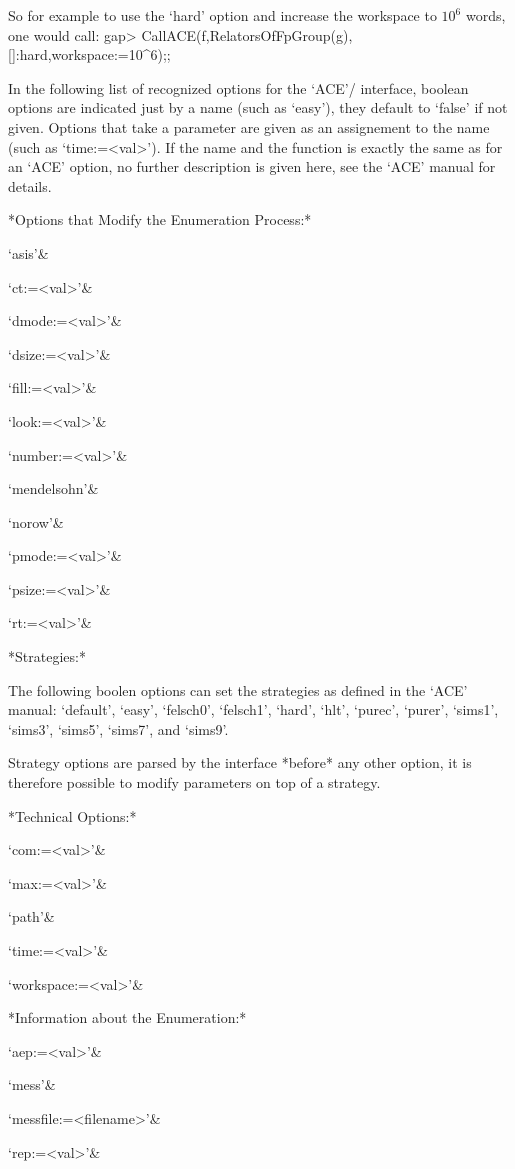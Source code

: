 So for example to use the `hard' option and increase the workspace to $10^6$
words, one would call:
\begintt
gap> CallACE(f,RelatorsOfFpGroup(g),[]:hard,workspace:=10^6);;
\endtt

In the following list of recognized options for
the `ACE'/{\GAP} interface, boolean options are indicated just by a name
(such as `easy'), they default to `false' if not given. Options that take a
parameter are given as an assignement to the name (such as `time:=<val>').
If the name and the function is exactly the same as for an `ACE' option, no
further description is given here, see the `ACE' manual for details.

*Options that Modify the Enumeration Process:*

\beginitems
`asis'&

`ct:=<val>'&

`dmode:=<val>'&

`dsize:=<val>'&

`fill:=<val>'&

`look:=<val>'&

`number:=<val>'&

`mendelsohn'&

`norow'&

`pmode:=<val>'&

`psize:=<val>'&

`rt:=<val>'&

*Strategies:*

The following boolen options can set the strategies as defined in the  `ACE'
manual: `default', `easy', `felsch0', `felsch1', `hard', `hlt', `purec',
`purer', `sims1', `sims3', `sims5', `sims7', and `sims9'.

Strategy options are parsed by the interface *before* any other option, it
is therefore possible to modify parameters on top of a strategy.

*Technical Options:*

\beginitems
`com:=<val>'&

`max:=<val>'&

`path'&

`time:=<val>'&

`workspace:=<val>'&
\enditems

*Information about the Enumeration:*

\beginitems
`aep:=<val>'&

`mess'&

`messfile:=<filename>'&

`rep:=<val>'&
\enditems

